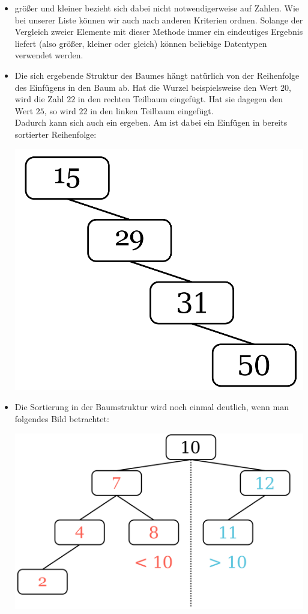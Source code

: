 \documentclass{article}
\begin{document}
\begin{itemize}
    \item größer und kleiner bezieht sich dabei nicht notwendigerweise auf Zahlen. Wie bei unserer Liste können wir auch nach anderen Kriterien ordnen. Solange der Vergleich zweier Elemente mit dieser Methode immer ein eindeutiges Ergebnis liefert (also größer, kleiner oder gleich) können beliebige Datentypen verwendet werden.
    \item Die sich ergebende Struktur des Baumes hängt natürlich von der Reihenfolge des Einfügens in den Baum ab. Hat die Wurzel beispielsweise den Wert $20$, wird die Zahl $22$ in den rechten Teilbaum eingefügt. Hat sie dagegen den Wert $25$, so wird $22$ in den linken Teilbaum eingefügt. \\
          Dadurch kann sich auch ein  ergeben. Am  ist dabei ein Einfügen in bereits sortierter Reihenfolge:
          \begin{center}
              \includegraphics[scale=0.15]{../media/linear.png}
          \end{center}
    \item Die Sortierung in der Baumstruktur wird noch einmal deutlich, wenn man folgendes Bild betrachtet:
          \begin{center}
              \includegraphics[scale=0.15]{../media/sortedTree.png}

\end{center}
\end{itemize}
\end{document}
